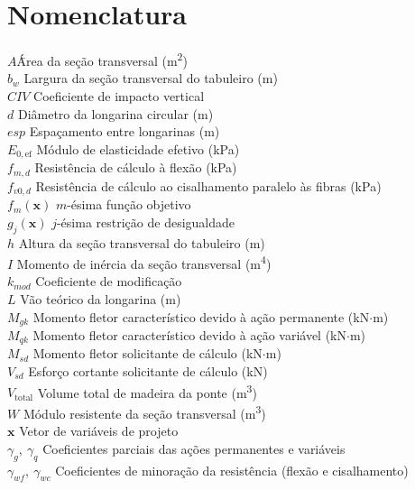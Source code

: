 \section*{Nomenclatura}

\begin{tabbing}
$A$\qquad\qquad \= Área da seção transversal (m\textsuperscript{2})\\
$b_w$ \> Largura da seção transversal do tabuleiro (m)\\
$CIV$ \> Coeficiente de impacto vertical\\
$d$ \> Diâmetro da longarina circular (m)\\
$esp$ \> Espaçamento entre longarinas (m)\\
$E_{0,\mathrm{ef}}$ \> Módulo de elasticidade efetivo (kPa)\\
$f_{m,d}$ \> Resistência de cálculo à flexão (kPa)\\
$f_{v0,d}$ \> Resistência de cálculo ao cisalhamento paralelo às fibras (kPa)\\
$f_m(\mathbf{x})$ \> $m$-ésima função objetivo\\
$g_j(\mathbf{x})$ \> $j$-ésima restrição de desigualdade\\
$h$ \> Altura da seção transversal do tabuleiro (m)\\
$I$ \> Momento de inércia da seção transversal (m\textsuperscript{4})\\
$k_{mod}$ \> Coeficiente de modificação\\
$L$ \> Vão teórico da longarina (m)\\
$M_{gk}$ \> Momento fletor característico devido à ação permanente (kN$\cdot$m)\\
$M_{qk}$ \> Momento fletor característico devido à ação variável (kN$\cdot$m)\\
$M_{sd}$ \> Momento fletor solicitante de cálculo (kN$\cdot$m)\\
$V_{sd}$ \> Esforço cortante solicitante de cálculo (kN)\\
$V_{\mathrm{total}}$ \> Volume total de madeira da ponte (m\textsuperscript{3})\\
$W$ \> Módulo resistente da seção transversal (m\textsuperscript{3})\\
$\mathbf{x}$ \> Vetor de variáveis de projeto\\
$\gamma_g,\ \gamma_q$ \> Coeficientes parciais das ações permanentes e variáveis\\
$\gamma_{wf},\ \gamma_{wc}$ \> Coeficientes de minoração da resistência (flexão e cisalhamento)\\

\end{tabbing}
